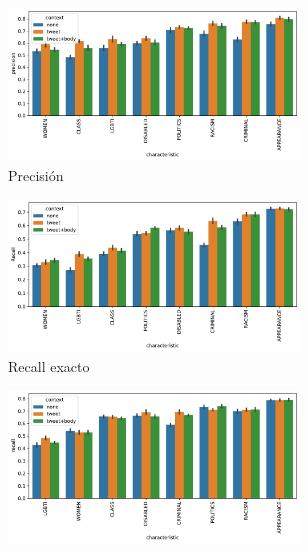 \begin{figure}[ht]
    \centering
    \small
    \begin{subfigure}[b]{\textwidth}
        \centering
        \includegraphics[width=0.85\textwidth]{img/context_classification/precision_barplot.pdf}
        \caption{Precisión}
    \end{subfigure}
    \begin{subfigure}[b]{\textwidth}
        \centering
        \includegraphics[width=0.85\textwidth]{img/context_classification/exact_recall_barplot.pdf}
        \caption{Recall exacto}
        \label{subfig:exact_recall}
    \end{subfigure}
    \begin{subfigure}[b]{\textwidth}
        \centering
        \includegraphics[width=0.85\textwidth]{img/context_classification/hate_recall_barplot.pdf}

\end{subfigure}
\end{figure}
